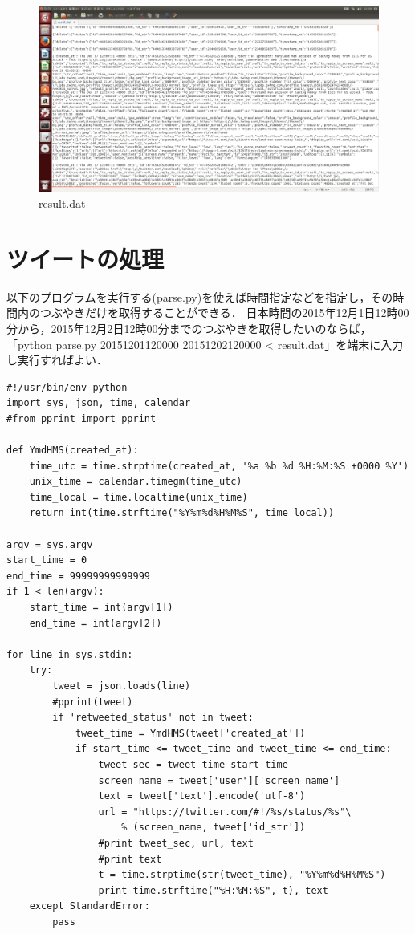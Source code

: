 \begin{figure}[H]
\centering
\includegraphics[width=15cm]{resultdat.png}
\caption{result.dat}\label{result.datの画像}
\end{figure}


\clearpage


\section{ツイートの処理}

以下のプログラムを実行する(parse.py)を使えば時間指定などを指定し，その時間内のつぶやきだけを取得することができる．
日本時間の2015年12月1日12時00分から，2015年12月2日12時00分までのつぶやきを取得したいのならば，「python parse.py 20151201120000 20151202120000 < result.dat」を端末に入力し実行すればよい．


{\small
\begin{lstlisting}
#!/usr/bin/env python
import sys, json, time, calendar
#from pprint import pprint
 
def YmdHMS(created_at):
    time_utc = time.strptime(created_at, '%a %b %d %H:%M:%S +0000 %Y')
    unix_time = calendar.timegm(time_utc)
    time_local = time.localtime(unix_time)
    return int(time.strftime("%Y%m%d%H%M%S", time_local))
 
argv = sys.argv
start_time = 0
end_time = 99999999999999
if 1 < len(argv):
    start_time = int(argv[1])
    end_time = int(argv[2])
 
for line in sys.stdin:
    try:
        tweet = json.loads(line)
        #pprint(tweet)
        if 'retweeted_status' not in tweet:
            tweet_time = YmdHMS(tweet['created_at'])
            if start_time <= tweet_time and tweet_time <= end_time:
                tweet_sec = tweet_time-start_time
                screen_name = tweet['user']['screen_name']
                text = tweet['text'].encode('utf-8')
                url = "https://twitter.com/#!/%s/status/%s"\
                    % (screen_name, tweet['id_str'])
                #print tweet_sec, url, text
                #print text
                t = time.strptime(str(tweet_time), "%Y%m%d%H%M%S")
                print time.strftime("%H:%M:%S", t), text
    except StandardError:
        pass
\end{lstlisting}}

